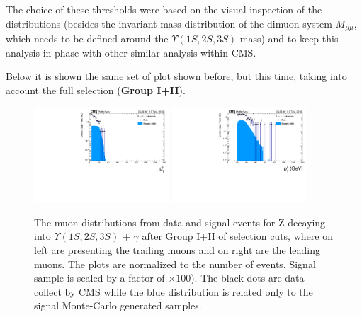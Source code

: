 The choice of these thresholds were based on the visual inspection of the distributions (besides the invariant mass distribution of the dimuon system $M_{\mu\mu}$, which needs to be defined around the $\Upsilon(1S, 2S, 3S)$ mass) and to keep this analysis in phase with other similar analysis within CMS.


Below it is shown the same set of plot shown before, but this time, taking into account the full selection (\textbf{Group I+II}).


\begin{figure}[!htbp]
\begin{center}
\includegraphics[width=0.45\textwidth]{figures_and_tables/outputPlots/ZtoUpsilon_Cat0_ZZZZZ/nEvts/data_x_mc/withKinCuts/h_withKin_TrailingMu_pt}\hspace*{1.cm}
\includegraphics[width=0.45\textwidth]{figures_and_tables/outputPlots/ZtoUpsilon_Cat0_ZZZZZ/nEvts/data_x_mc/withKinCuts/h_withKin_LeadingMu_pt}
\end{center}\vspace*{-.5cm}
\caption{The \PT muon distributions from data and signal events for Z decaying into $\Upsilon(1S,2S,3S)$ + $\gamma$ after Group I+II of selection cuts, where on left are presenting the trailing muons and on right are the leading muons. The plots are normalized to the number of events. Signal sample is scaled by a factor of $\times 100$). The black dots are data collect by CMS while the blue distribution is related only to the signal Monte-Carlo generated samples.}
\label{fig:pTMuons_ZtoUpsilon_Cat0_groupI_plus_II}
\end{figure}


